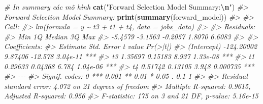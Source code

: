 \documentclass[
]{article}
\newenvironment{Shaded}{\begin{snugshade}}{\end{snugshade}}
\newcommand{\CommentTok}[1]{\textcolor[rgb]{0.56,0.35,0.01}{\textit{#1}}}
\newcommand{\FunctionTok}[1]{\textcolor[rgb]{0.13,0.29,0.53}{\textbf{#1}}}
\newcommand{\NormalTok}[1]{#1}
\newcommand{\SpecialCharTok}[1]{\textcolor[rgb]{0.81,0.36,0.00}{\textbf{#1}}}
\newcommand{\StringTok}[1]{\textcolor[rgb]{0.31,0.60,0.02}{#1}}
\begin{document}
\begin{Shaded}
\begin{Highlighting}[]
  \CommentTok{\# In summary các mô hình}
\FunctionTok{cat}\NormalTok{(}\StringTok{"Forward Selection Model Summary:}\SpecialCharTok{\textbackslash{}n}\StringTok{"}\NormalTok{)}
\CommentTok{\#\textgreater{} Forward Selection Model Summary:}
\FunctionTok{print}\NormalTok{(}\FunctionTok{summary}\NormalTok{(forward\_model))}
\CommentTok{\#\textgreater{} }
\CommentTok{\#\textgreater{} Call:}
\CommentTok{\#\textgreater{} lm(formula = y \textasciitilde{} t3 + t1 + t4, data = jobs\_data)}
\CommentTok{\#\textgreater{} }
\CommentTok{\#\textgreater{} Residuals:}
\CommentTok{\#\textgreater{}     Min      1Q  Median      3Q     Max }
\CommentTok{\#\textgreater{} {-}5.4579 {-}3.1563 {-}0.2057  1.8070  6.6083 }
\CommentTok{\#\textgreater{} }
\CommentTok{\#\textgreater{} Coefficients:}
\CommentTok{\#\textgreater{}               Estimate Std. Error t value Pr(\textgreater{}|t|)    }
\CommentTok{\#\textgreater{} (Intercept) {-}124.20002    9.87406 {-}12.578 3.04e{-}11 ***}
\CommentTok{\#\textgreater{} t3             1.35697    0.15183   8.937 1.33e{-}08 ***}
\CommentTok{\#\textgreater{} t1             0.29633    0.04368   6.784 1.04e{-}06 ***}
\CommentTok{\#\textgreater{} t4             0.51742    0.13105   3.948 0.000735 ***}
\CommentTok{\#\textgreater{} {-}{-}{-}}
\CommentTok{\#\textgreater{} Signif. codes:  0 \textquotesingle{}***\textquotesingle{} 0.001 \textquotesingle{}**\textquotesingle{} 0.01 \textquotesingle{}*\textquotesingle{} 0.05 \textquotesingle{}.\textquotesingle{} 0.1 \textquotesingle{} \textquotesingle{} 1}
\CommentTok{\#\textgreater{} }
\CommentTok{\#\textgreater{} Residual standard error: 4.072 on 21 degrees of freedom}
\CommentTok{\#\textgreater{} Multiple R{-}squared:  0.9615, Adjusted R{-}squared:  0.956 }
\CommentTok{\#\textgreater{} F{-}statistic:   175 on 3 and 21 DF,  p{-}value: 5.16e{-}15}


\end{Highlighting}
\end{Shaded}
\end{document}
